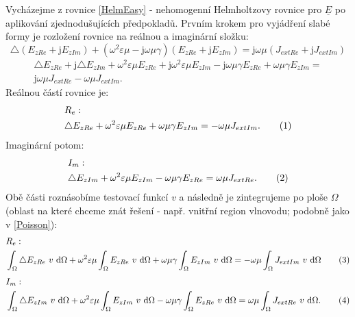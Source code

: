\documentclass[12pt,a4paper,oneside]{article}
\numberwithin{equation}{section} %
\numberwithin{figure}{section} %
\numberwithin{table}{section} %
\newcommand{\mj}{\mathrm{j}} %
\newcommand{\faz}[1]{{\underline{#1}}} %
\newcommand\numberthis{\addtocounter{equation}{1}\tag{\theequation}}
\begin{document}
Vycházejme z rovnice \ref{HelmEasy} - nehomogenní Helmholtzovy rovnice pro $\faz{E}$ po aplikování zjednodušujících předpokladů. Prvním krokem pro vyjádření slabé formy je rozložení rovnice na reálnou a imaginární složku:
\begin{equation}
\triangle (E _{zRe} + \mj E _{zIm}) + (\omega ^2 \varepsilon \mu - \mj \omega \mu \gamma) (E _{zRe} + \mj E _{zIm}) = \mj \omega \mu (J _{extRe} + \mj J _{extIm})
\end{equation}
\begin{equation}
\begin{split}
\triangle E _{zRe} + \mj \triangle E _{zIm} + \omega ^2 \varepsilon \mu E_ {zRe} + \mj \omega ^2 \varepsilon \mu E _{zIm} - \mj \omega \mu \gamma E _{zRe} + \omega \mu \gamma E _{zIm} =\\
\mj \omega \mu J _{extRe} - \omega \mu J _{extIm} .
\end{split}
\end{equation}
Reálnou částí rovnice je:
\begin{align*}
&R_{e}:
\\
&\triangle E_ {zRe} + \omega ^2 \varepsilon \mu E_ {zRe} + \omega \mu \gamma E _{zIm} = - \omega \mu J _{extIm} .
\numberthis
\end{align*}
Imaginární potom:
\begin{align*}
&I_{m}:
\\
&\triangle E _{zIm} + \omega ^2 \varepsilon \mu E _{zIm} - \omega \mu \gamma E _{zRe} = \omega \mu J _{extRe} .
\numberthis
\end{align*}
Obě části roznásobíme testovací funkcí $v$ a následně je  zintegrujeme po ploše $\Omega$ (oblast na které chceme znát řešení - např. vnitřní region vlnovodu; podobně jako v \ref{Poisson}):
\begin{align*}
&R_e:
\\
&\int _{\Omega} \triangle E _{zRe} ~ v ~ \ud \Omega + \omega ^2 \varepsilon \mu \int _{\Omega} E _{zRe} ~ v ~ \ud \Omega + \omega \mu \gamma \int _{\Omega} E _{zIm} ~ v ~ \ud \Omega = - \omega \mu \int _{\Omega} J _{extIm} ~ v ~ \ud \Omega
\numberthis
\end{align*}
\begin{align*}
&I_m:
\\
&\int _{\Omega} \triangle E _{zIm} ~ v ~ \ud \Omega + \omega ^2 \varepsilon \mu \int _{\Omega} E _{zIm} ~ v ~ \ud \Omega - \omega \mu \gamma \int _{\Omega} E _{zRe} ~ v ~ \ud \Omega = \omega \mu \int _{\Omega} J _{extRe} ~ v ~ \ud \Omega .
\numberthis
\end{align*}
\end{document}
